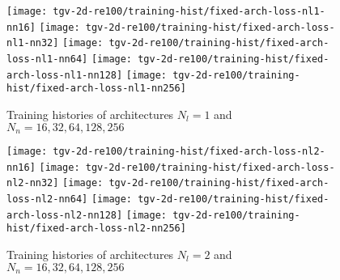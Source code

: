 
\begin{landscape}
    \singlespacing
    \scriptsize
    \centering
    
\end{landscape}

\begin{figure}[H]
    \centering
    \vfill
    \texttt{[image: tgv-2d-re100/training-hist/fixed-arch-loss-nl1-nn16]}%
    \hfill
    \texttt{[image: tgv-2d-re100/training-hist/fixed-arch-loss-nl1-nn32]}%
    \newline
    \texttt{[image: tgv-2d-re100/training-hist/fixed-arch-loss-nl1-nn64]}%
    \hfill
    \texttt{[image: tgv-2d-re100/training-hist/fixed-arch-loss-nl1-nn128]}%
    \newline
    \texttt{[image: tgv-2d-re100/training-hist/fixed-arch-loss-nl1-nn256]}%
    \caption{Training histories of architectures $N_l=1$ and $N_n=16,32,64,128,256$}
\end{figure}

\begin{figure}[H]
    \centering
    \texttt{[image: tgv-2d-re100/training-hist/fixed-arch-loss-nl2-nn16]}%
    \hfill
    \texttt{[image: tgv-2d-re100/training-hist/fixed-arch-loss-nl2-nn32]}%
    \newline
    \texttt{[image: tgv-2d-re100/training-hist/fixed-arch-loss-nl2-nn64]}%
    \hfill
    \texttt{[image: tgv-2d-re100/training-hist/fixed-arch-loss-nl2-nn128]}%
    \newline
    \texttt{[image: tgv-2d-re100/training-hist/fixed-arch-loss-nl2-nn256]}%
    \caption{Training histories of architectures $N_l=2$ and $N_n=16,32,64,128,256$}
\end{figure}

